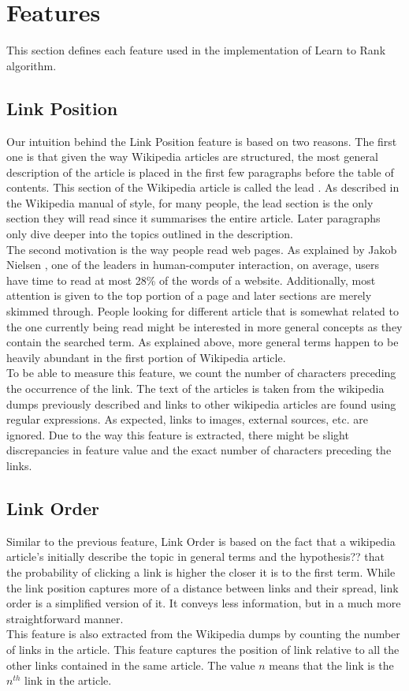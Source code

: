 \section{Features}
This section defines each feature used in the implementation of Learn to Rank algorithm.

\subsection{Link Position}
Our intuition behind the Link Position feature is based on two reasons. The first one is that given the way Wikipedia articles are structured, the most general description of the article is placed in the first few paragraphs before the table of contents. This section of the Wikipedia article is called the lead \cite{lead}. As described in the Wikipedia manual of style, for many people, the lead section is the only section they will read since it summarises the entire article. Later paragraphs only dive deeper into the topics outlined in the description. \\
The second motivation is the way people read web pages. As explained by Jakob Nielsen  \cite{nielsen}, one of the leaders in human-computer interaction, on average, users have time to read at most 28\% of the words of a website. Additionally, most attention is given to the top portion of a page and later sections are merely skimmed through. People looking for different article that is somewhat related to the one currently being read might be interested in more general concepts as they contain the searched term. As explained above, more general terms happen to be heavily abundant in the first portion of Wikipedia article. \\
To be able to measure this feature, we count the number of characters preceding the occurrence of the link. The text of the articles is taken from the wikipedia dumps previously described and links to other wikipedia articles are found using regular expressions. As expected, links to images, external sources, etc. are ignored. Due to the way this feature is extracted, there might be slight discrepancies in feature value and the exact number of characters preceding the links. \\

\subsection{Link Order}
Similar to the previous feature, Link Order is based on the fact that a wikipedia article's initially describe the topic in general terms and the hypothesis?? that the probability of clicking a link is higher the closer it is to the first term. While the link position captures more of a distance between links and their spread, link order is a simplified version of it. It conveys less information, but in a much more straightforward manner. \\
This feature is also extracted from the Wikipedia dumps by counting the number of links in the article. This feature captures the position of link relative to all the other links contained in the same article. The value $n$ means that the link is the $n^{th}$ link in the article. \\

